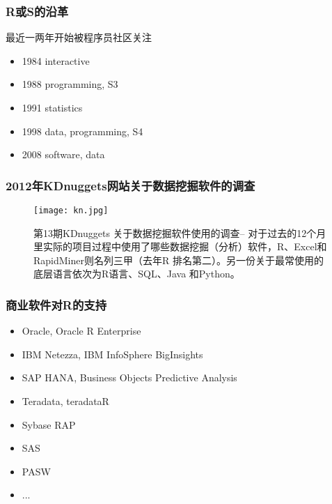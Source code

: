 \documentclass[UTF8,                %
               table,               %
               9pt,                %
               aspectratio=43]      %
               {beamer}
\begin{document}
\begin{frame}
  \frametitle{R或S的沿革}

  最近一两年开始被程序员社区关注
  \begin{itemize}
          \item 1984 interactive
          \item 1988 programming, S3
          \item 1991 statistics
          \item 1998 data, programming, S4
          \item 2008 software, data
  \end{itemize}
\end{frame}

\begin{frame}
    \frametitle{2012年KDnuggets网站关于数据挖掘软件的调查}
    \begin{figure}
      \centering
      \texttt{[image: kn.jpg]}\\
      \caption{第13期KDnuggets 关于数据挖掘软件使用的调查-- 对于过去的12个月里实际的项目过程中使用了哪些数据挖掘（分析）软件，R、Excel和RapidMiner则名列三甲（去年R 排名第二）。另一份关于最常使用的底层语言依次为R语言、SQL、Java 和Python。}
    \end{figure}
\end{frame}

\begin{frame}
  \frametitle{商业软件对R的支持}
  \begin{itemize}
    \item Oracle, Oracle R Enterprise
    \item IBM Netezza, IBM InfoSphere BigInsights
    \item SAP HANA, Business Objects Predictive Analysis
    \item Teradata, teradataR
    \item Sybase RAP
    \item SAS
    \item PASW
    \item ...
  \end{itemize}
\end{frame}
\end{document}
